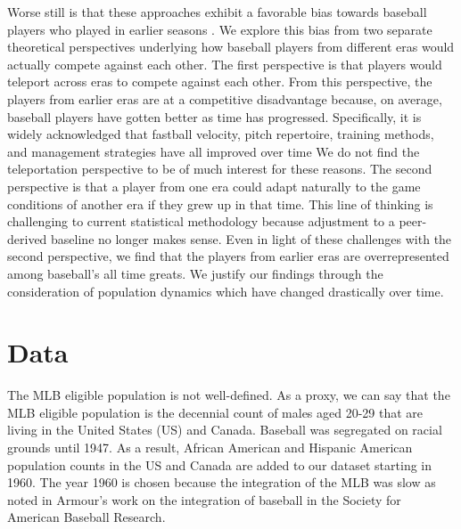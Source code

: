\documentclass[11pt]{article}\usepackage[]{graphicx}\usepackage[]{color}
\begin{document}
Worse still is that these approaches exhibit a favorable bias towards baseball 
players who played in earlier seasons 
\citep{schmidt2005concentration}.  
We explore this bias from two separate theoretical perspectives underlying how 
baseball players from different eras would actually compete against each 
other.  The first perspective is that players would teleport across eras to 
compete against each other.  From this perspective, the players from earlier eras 
are at a competitive disadvantage because, on average, baseball players have 
gotten better as time has progressed.
Specifically, it is widely acknowledged that 
fastball velocity, pitch repertoire, training methods, and management 
strategies have all improved over time   
We do not find the teleportation perspective to be of 
much interest for these reasons.  The second perspective is that a player from 
one era could adapt naturally to the game conditions of another era if they 
grew up in that time. 
This line of thinking is challenging to current statistical methodology because 
adjustment to a peer-derived baseline no longer makes sense. 
Even in light of these challenges with the second perspective, we find that the 
players from earlier eras are overrepresented among baseball's all time greats.  
We justify our findings through the consideration of population dynamics which 
have changed drastically over time.  %



\section{Data}

The MLB eligible population is not well-defined.  As a proxy, we can say 
that the MLB eligible population is the decennial count of males aged 
20-29 that are living in the United States (US) and Canada. 
Baseball was segregated on racial grounds until 1947.  As a result, 
African American and Hispanic American population counts in the US  
and Canada are added to our dataset starting in 1960.  The year 1960 is chosen 
because the integration of the MLB was slow as noted in Armour's work on the 
integration of baseball in the Society for American Baseball Research.
\end{document}
